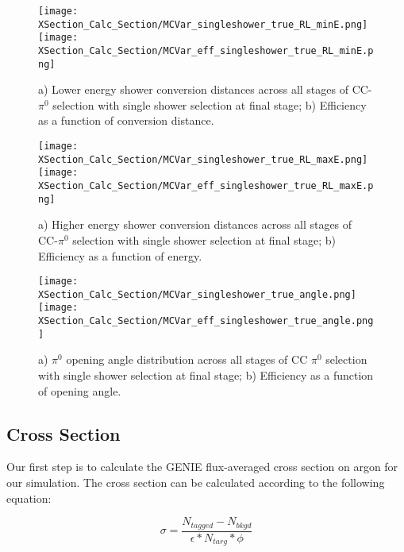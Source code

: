 \documentclass{article}
\begin{document}
\begin{figure}[h!]
\centering
\texttt{[image: XSection\_Calc\_Section/MCVar\_singleshower\_true\_RL\_minE.png]}
\hspace{1 mm}
\texttt{[image: XSection\_Calc\_Section/MCVar\_eff\_singleshower\_true\_RL\_minE.png]}
\caption{a) Lower energy shower conversion distances across all stages of CC-$\pi^0$ selection with single shower selection at final stage; b) Efficiency as a function of conversion distance. }
\label{fig:pi0_effs_11}
\end{figure}

\begin{figure}[h!]
\centering
\texttt{[image: XSection\_Calc\_Section/MCVar\_singleshower\_true\_RL\_maxE.png]}
\hspace{1 mm}
\texttt{[image: XSection\_Calc\_Section/MCVar\_eff\_singleshower\_true\_RL\_maxE.png]}
\caption{a) Higher energy shower conversion distances across all stages of CC-$\pi^0$ selection with single shower selection at final stage; b) Efficiency as a function of energy. }
\label{fig:pi0_effs_12}
\end{figure}


\begin{figure}[h!]
\texttt{[image: XSection\_Calc\_Section/MCVar\_singleshower\_true\_angle.png]}
\hspace{3 mm}
\texttt{[image: XSection\_Calc\_Section/MCVar\_eff\_singleshower\_true\_angle.png]}
\caption{a) $\pi^0$ opening angle distribution across all stages of CC $\pi^0$ selection with single shower selection at final stage; b) Efficiency as a function of opening angle. }
\label{fig:pi0_effs_13}
\end{figure}

\clearpage
\subsection{Cross Section}

Our first step is to calculate the GENIE flux-averaged cross section on argon for our simulation. The cross section can be calculated according to the following equation:

\begin{equation}
  \sigma = \frac{N_{tagged} - N_{bkgd}}{\epsilon*N_{targ}*\phi}
\end{equation}
\end{document}

